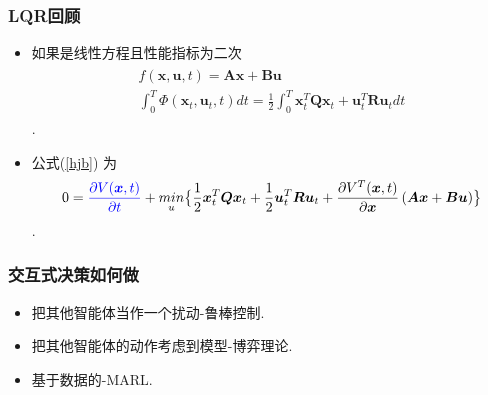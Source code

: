\documentclass[UTF8, aspectratio=169, 10pt]{ctexbeamer}
\begin{document}
\begin{frame}
  \frametitle{LQR回顾}
  \begin{itemize}
  \item 如果是线性方程且性能指标为二次
    \begin{align}
      \begin{split}
        f( \boldsymbol{x}, \boldsymbol{u}, t ) = \boldsymbol{A x} +
        \boldsymbol{B u} \\
        \int_0^T \Phi ( \boldsymbol{x}_t,  \boldsymbol{u}_t, t ) dt  =
        \frac{1}{2} \int_0^T \boldsymbol{x}^T_t \boldsymbol{Q} \boldsymbol{x}_t
        + \boldsymbol{u}^T_t \boldsymbol{R} \boldsymbol{u}_t dt
      \end{split}
    \end{align}.
  \item 公式(\ref{hjb}) 为
      \begin{align}
      \label{linear-hjb}
      0 = \textcolor{blue} { \frac{ \partial V
      ( \boldsymbol{x}, t )}{ \partial t } }  +
      \underset{u}{min} \big \{
        \frac{1}{2}  \boldsymbol{x}^T_t \boldsymbol{Q} \boldsymbol{x}_t
        + \frac{1}{2} \boldsymbol{u}^T_t \boldsymbol{R} \boldsymbol{u}_t
        + \frac{
      \partial V^T ( \boldsymbol{x}, t  ) } { \partial
      \boldsymbol{x}  } \, ( \boldsymbol{A x} +
        \boldsymbol{B u} )
      \big \}
    \end{align}.

  \end{itemize}
\end{frame}

\begin{frame}
  \frametitle{交互式决策如何做}
  \begin{itemize}
  \item 把其他智能体当作一个扰动-鲁棒控制.
  \item 把其他智能体的动作考虑到模型-博弈理论.
  \item 基于数据的-MARL.
  \end{itemize}
\end{frame}
\end{document}
